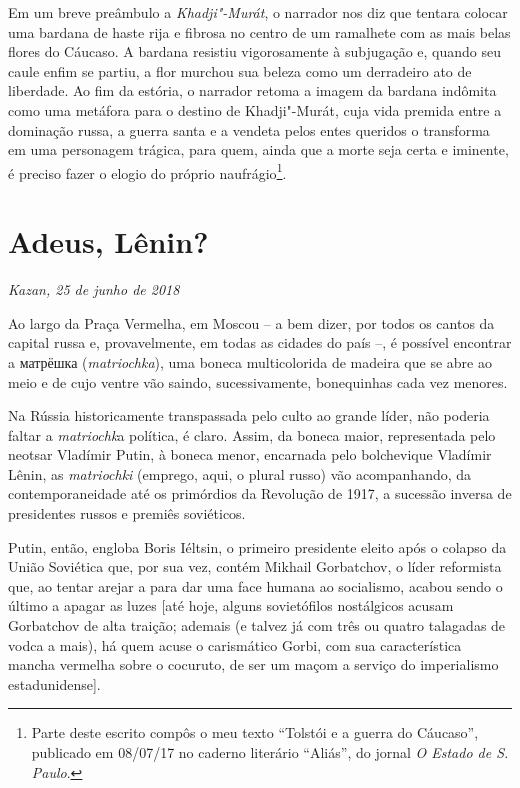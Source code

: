 Em um breve preâmbulo a \emph{Khadji"-Murát}, o narrador nos diz que
tentara colocar uma bardana de haste rija e fibrosa no centro de um
ramalhete com as mais belas flores do Cáucaso. A bardana resistiu
vigorosamente à subjugação e, quando seu caule enfim se partiu, a flor
murchou sua beleza como um derradeiro ato de liberdade. Ao fim da
estória, o narrador retoma a imagem da bardana indômita como uma
metáfora para o destino de Khadji"-Murát, cuja vida premida entre a
dominação russa, a guerra santa e a vendeta pelos entes queridos o
transforma em uma personagem trágica, para quem, ainda que a morte seja
certa e iminente, é preciso fazer o elogio do próprio
naufrágio\footnote{Parte deste escrito compôs o meu texto ``Tolstói e a
  guerra do Cáucaso'', publicado em 08/07/17 no caderno literário
  ``Aliás'', do jornal \emph{O Estado de S. Paulo}.}.

\chapter*{Adeus, Lênin?}

\begin{flushright}
\emph{Kazan, 25 de junho de 2018}
\end{flushright}
Ao largo da Praça Vermelha, em Moscou -- a bem dizer, por todos os
cantos da capital russa e, provavelmente, em todas as cidades do país
--, é possível encontrar a матрёшка (\emph{matriochka}), uma boneca
multicolorida de madeira que se abre ao meio e de cujo ventre vão
saindo, sucessivamente, bonequinhas cada vez menores.

Na Rússia historicamente transpassada pelo culto ao grande líder, não
poderia faltar a \emph{matriochk}a política, é claro. Assim, da boneca
maior, representada pelo neotsar Vladímir Putin, à boneca menor,
encarnada pelo bolchevique Vladímir Lênin, as \emph{matriochki}
(emprego, aqui, o plural russo) vão acompanhando, da contemporaneidade
até os primórdios da Revolução de 1917, a sucessão inversa de
presidentes russos e premiês soviéticos.

Putin, então, engloba Boris Iéltsin, o primeiro presidente eleito após o
colapso da União Soviética que, por sua vez, contém Mikhail Gorbatchov,
o líder reformista que, ao tentar arejar a  para dar uma face humana
ao socialismo, acabou sendo o último a apagar as luzes {[}até hoje,
alguns sovietófilos nostálgicos acusam Gorbatchov de alta traição;
ademais (e talvez já com três ou quatro talagadas de vodca a mais), há
quem acuse o carismático Gorbi, com sua característica mancha vermelha
sobre o cocuruto, de ser um maçom a serviço do imperialismo
estadunidense{]}.

